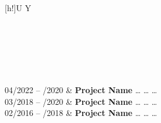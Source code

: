\begin{xltabular}{\textwidth}[h!]{U Y}

 \hrulefill \\ \\ 
\endfirsthead

 \hrulefill \\ \\ 
\endhead

04/2022 – /2020 			&	\textbf{Project Name} \newline
						\dots \newline
						\dots \newline
						\dots \newline
						\\
					
03/2018 – /2020 			&	\textbf{Project Name} \newline
						\dots \newline
						\dots \newline
						\dots \newline
						\\
					
02/2016 – /2018 			&	\textbf{Project Name} \newline
						\dots \newline
						\dots \newline
						\dots \newline
						\\

\end{xltabular}